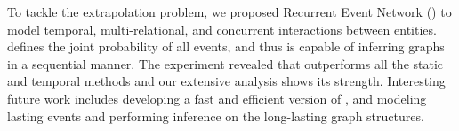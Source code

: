 
To tackle the extrapolation problem, we proposed Recurrent Event Network (\method) to model temporal, multi-relational, and concurrent interactions between entities. 
\method defines the joint probability of all events, and thus is capable of inferring graphs in a sequential manner.
The experiment revealed that \method outperforms all the static and temporal methods and our extensive analysis shows its strength.
Interesting future work includes developing a fast and efficient version of \method, and modeling lasting events and performing inference on the long-lasting graph structures.


